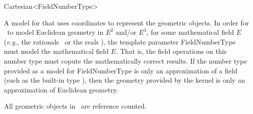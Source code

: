 \begin{ccRefClass}{Cartesian<FieldNumberType>}

\ccDefinition
A model for  that uses  coordinates to represent the
geometric objects.  In order for \ccRefName\ to model Euclidean geometry
in $E^2$ and/or $E^3$, for some mathematical field $E$ (\textit{e.g.},
the rationals \Q\ or the reals \R), the template parameter FieldNumberType 
must model the mathematical field $E$.  That is, the field operations on this
number type must copute the mathematically correct results.  If the number 
type provided as a model for FieldNumberType is only an approximation of a 
field (such as the built-in type ), then the geometry provided by 
the kernel is only an approximation of Euclidean geometry.  

\ccIsModel
{}

\ccTypes
{}
\ccGlue
{}

\ccImplementation
All geometric objects in \ccRefName\ are reference counted.

\ccSeeAlso
{}  \\
 \\
 \\

\end{ccRefClass}
